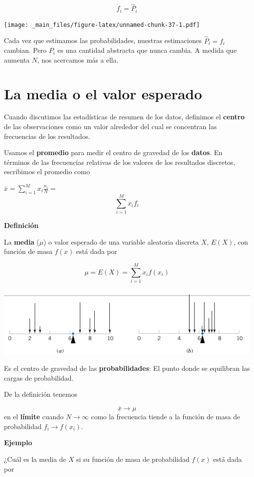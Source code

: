 \documentclass[
]{book}
\begin{document}
\[f_i = \hat{P}_i\]

\texttt{[image: \_main\_files/figure-latex/unnamed-chunk-37-1.pdf]}

Cada vez que estimamos las probabilidades, nuestras estimaciones \(\hat{P}_i=f_i\) cambian. Pero \(P_i\) es una cantidad abstracta que nunca cambia. A medida que aumenta \(N\), nos acercamos más a ella.

\hypertarget{la-media-o-el-valor-esperado}{%
\section{La media o el valor esperado}\label{la-media-o-el-valor-esperado}}

Cuando discutimos las estadísticas de resumen de los datos, definimos el \textbf{centro} de las observaciones como un valor alrededor del cual se concentran las frecuencias de los resultados.

Usamos el \textbf{promedio} para medir el centro de gravedad de los \textbf{datos}. En términos de las frecuencias relativas de los valores de los resultados discretos, escribimos el promedio como

\(\bar{x}= \sum_{i=1}^M x_i \frac{n_i}{N}=\) \[\sum_{i=1}^M x_i f_i\]

\textbf{Definición}

La \textbf{media} (\(\mu\)) o valor esperado de una variable aleatoria discreta \(X\), \(E(X)\), con función de masa \(f(x)\) está dada por

\[ \mu = E(X)= \sum_{i=1}^M x_i f(x_i) \]

\includegraphics{./figures/mu.png}

Es el centro de gravedad de las \textbf{probabilidades}: El punto donde se equilibran las cargas de probabilidad.

De la definición tenemos

\[\bar{x} \rightarrow \mu\] en el \textbf{límite} cuando
\(N \rightarrow \infty\) como la frecuencia tiende a la función de masa de probabilidad \(f_i \rightarrow f(x_i)\).

\textbf{Ejemplo}

¿Cuál es la media de \(X\) si su función de masa de probabilidad \(f(x)\) está dada por
\end{document}
